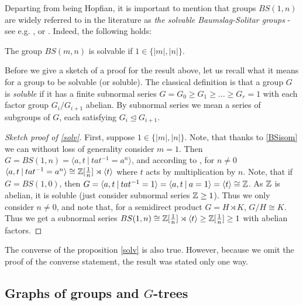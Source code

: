 Departing from being Hopfian, it is important to mention that groups $BS(1,n)$ are widely referred to in the literature as \emph{the solvable Baumslag-Solitar groups} - see e.g. \cite{BoDePu2018}, \cite{FaMo98} or \cite{Gr96}. Indeed, the following holds:

\begin{proposition}\label{solv}
    The group $BS(m,n)$ is solvable if $1 \in \{|m|,|n|\}$.
\end{proposition} 

\begin{remark}
    Before we give a sketch of a proof for the result above, let us recall what it means for a group to be solvable (or soluble). The classical definition is that a group $G$ is \emph{soluble} if it has a finite subnormal series $G = G_0 \ge G_1 \ge \ldots \ge G_r =1$ with each factor group $G_i/G_{i+1}$ abelian. By subnormal series we mean a series of subgroups of $G$, each satisfying $G_i \unlhd G_{i+1}$.
\end{remark}

\begin{proof}[Sketch proof of \ref{solv}]
    First, suppose $1 \in \{|m|,|n|\}$. Note, that thanks to \ref{BSisom} we can without loss of generality consider $m = 1$. Then $G = BS(1,n) = \langle a,t \: | \: tat^{-1} = a^n \rangle$, and according to \cite{Gi79}, for $n \neq 0$ $\langle a,t \: | \: tat^{-1} = a^n \rangle \cong \mathbb{Z}[\frac{1}{n}]\rtimes \langle t \rangle$ where $t$ acts by multiplication by $n$. Note, that if $G = BS(1,0)$, then $G = \langle a,t \: | \: tat^{-1} = 1 \rangle = \langle a,t \: | \: a = 1 \rangle = \langle t \rangle \cong \mathbb{Z}$. As $\mathbb{Z}$ is abelian, it is soluble (just consider subnormal series $\mathbb{Z} \ge 1$). Thus we only consider $n \neq 0$, and note that, for a semidirect product $G = H \rtimes K$, $G/H \cong K$. Thus we get a subnormal series $BS(1,n) \cong \mathbb{Z}[\frac{1}{n}]\rtimes \langle t \rangle \ge \mathbb{Z}[\frac{1}{n}] \ge 1$ with abelian factors.
\end{proof}

\begin{remark}
    The converse of the proposition \ref{solv} is also true. However, because we omit the proof of the converse statement, the result was stated only one way.
\end{remark}


\subsection{Graphs of groups and $G$-trees}
\label{subsec:graphs_of_groups}

